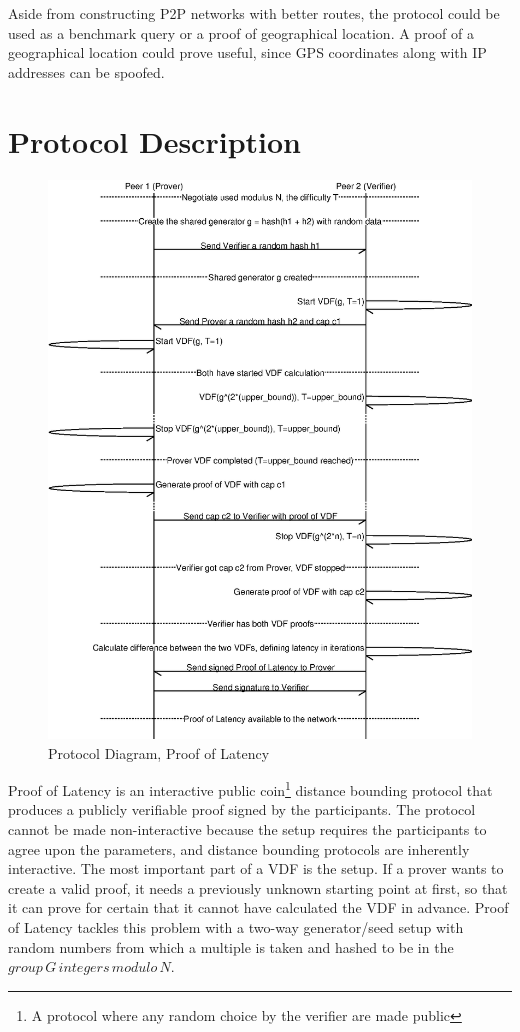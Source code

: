 Aside from constructing P2P networks with better routes, the protocol could be used as a benchmark query or a proof of geographical location. A proof of a geographical location could prove useful, since GPS coordinates along with IP addresses can be spoofed.

\section{Protocol Description}
\begin{figure}
	\includegraphics[width=\textwidth]{pictures/pol2_diagram.eps}
	\caption{Protocol Diagram, Proof of Latency}
	\label{PoL Diagram 2}
\end{figure}
Proof of Latency is an interactive public coin\footnote{A protocol where any random choice by the verifier are made public} distance bounding protocol that produces a publicly verifiable proof signed by the participants. The protocol cannot be made non-interactive because the setup requires the participants to agree upon the parameters, and distance bounding protocols are inherently interactive.
The most important part of a VDF is the setup. If a prover wants to create a valid proof, it needs a previously unknown starting point at first, so that it can prove for certain that it cannot have calculated the VDF in advance. Proof of Latency tackles this problem with a two-way generator/seed setup with random numbers from which a multiple is taken and hashed to be in the \(group\, G\, integers\, modulo\, N\).


